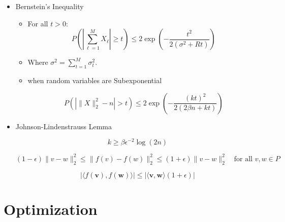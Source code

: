 \documentclass{article}
\begin{document}
\begin{itemize}
\begin{itemize}
\end{itemize}

\item Bernstein's Inequality

\begin{itemize}[leftmargin=*]
    \item For all $t > 0$:
    \[
    P\left( \left| \sum_{\ell=1}^{M} X_\ell \right| \geq t \right) \leq 2 \exp\left( -\frac{t^2}{2(\sigma^2 + Rt)} \right)
    \]
    \item Where $\sigma^2 = \sum_{t=1}^{M} \sigma_t^2$.
\item when random variables are Subexponential

\[
P\left(\left| \|X\|_2^2 - n \right| > t \right) \leq 2 \exp \left( - \frac{(kt)^2}{2(2\beta n + kt)} \right)
\]


\end{itemize}

\item Johnson-Lindenstrauss Lemma 



\[
k \geq \beta \epsilon^{-2} \log(2n)
\]

       \[
        (1 - \epsilon) \|v - w\|^2_2 \leq \|f(v) - f(w)\|^2_2 \leq (1 + \epsilon) \|v - w\|^2_2 \quad \text{for all } v, w \in P
         \]



\[ |\langle f(\mathbf{v}), f(\mathbf{w}) \rangle| \leq |\langle \mathbf{v}, \mathbf{w} \rangle (1 + \epsilon)| \]


\end{itemize}

\section{Optimization}
\end{document}
